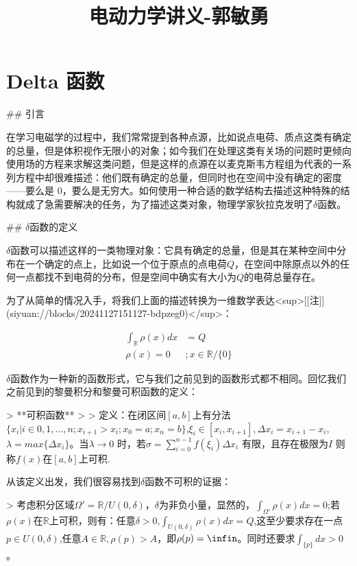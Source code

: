 \documentclass[lang=cn,10pt,newtx,bibend=biber,device=pad]{elegantbook}
\title{电动力学讲义-郭敏勇}
\begin{document}
	
	\maketitle
	\frontmatter
	
	\tableofcontents
	
	\mainmatter
	
	\chapter{Delta 函数}
	## 引言

在学习电磁学的过程中，我们常常提到各种点源，比如说点电荷、质点这类有确定的总量，但是体积视作无限小的对象；如今我们在处理这类有关场的问题时更倾向使用场的方程来求解这类问题，但是这样的点源在以麦克斯韦方程组为代表的一系列方程中却很难描述：他们既有确定的总量，但同时也在空间中没有确定的密度——要么是 0，要么是无穷大。如何使用一种合适的数学结构去描述这种特殊的结构就成了急需要解决的任务，为了描述这类对象，物理学家狄拉克发明了$\delta$函数。

## $\delta$函数的定义

$\delta$函数可以描述这样的一类物理对象：它具有确定的总量，但是其在某种空间中分布在一个确定的点上，比如说一个位于原点的点电荷$Q$，在空间中除原点以外的任何一点都找不到电荷的分布，但是空间中确实有大小为$Q $的电荷总量存在。

为了从简单的情况入手，将我们上面的描述转换为一维数学表达<sup>[[注]](siyuan://blocks/20241127151127-bdpzeg0)</sup>：

$$
\begin{align}

\int_{\mathbb{R}}\rho(x)dx&=Q \\\rho(x)=0&;x\in\mathbb{R}/\{0\}

\end{align}
$$

$\delta$函数作为一种新的函数形式，它与我们之前见到的函数形式都不相同。回忆我们之前见到的黎曼积分和黎曼可积函数的定义：

> **可积函数**
>
> 定义：在闭区间$[a,b]$上有分法$\{x_i|i\in {0,1,...,n};x_{i+1}>x_i;x_0 =a;x_n=b\}$,$\xi_i \in [x_{i},x_{i+1}],\Delta x_i = x_{i+1} - x_i$,$\lambda = max \{ \Delta x_i \}$。当$\lambda \rightarrow0$ 时，若$\sigma = \sum_{i=0}^{n-1}f(\xi_i)\Delta x_i$ 有限，且存在极限为$I$ 则称$f(x)$在$[a,b]$上可积.

从该定义出发，我们很容易找到$\delta$函数不可积的证据：

> 考虑积分区域$\Omega' = \mathbb{R}/U(0,\delta)$，$\delta$为非负小量，显然的，$\int_{\Omega'}\rho(x)dx= 0$;若$\rho(x)$在$\mathbb{R}$上可积，则有：任意$\delta>0$,$\int_{U(0,\delta)}\rho(x)dx=Q$,这至少要求存在一点$p\in U(0,\delta)$,任意$A \in \mathbb{R},\rho(p)>A$，即$\rho(p)= \infin$。同时还要求$\int_{\{p\}} dx > 0$。
\end{document}
